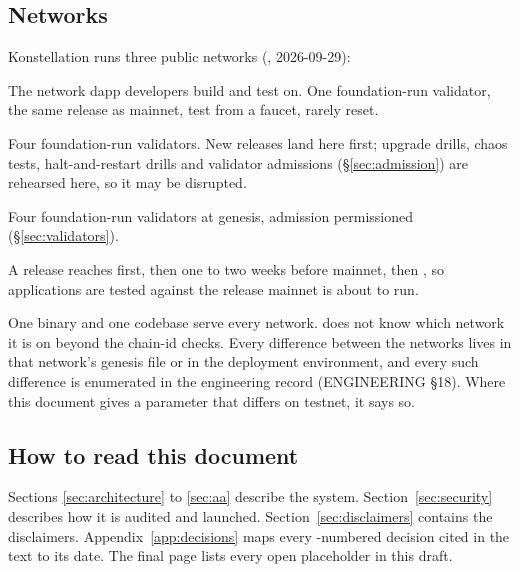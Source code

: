 \subsection{Networks}
\label{sec:networks}

Konstellation runs three public networks (, 2026-09-29):

\begin{description}[style=nextline]
\item[\code{devnet-1} --- for application developers.] The network dapp
  developers build and test on. One foundation-run validator, the same
  release as mainnet, test \kash{} from a faucet, rarely reset.
\item[\code{testnet-1} --- for validators and operations.] Four
  foundation-run validators. New releases land here first; upgrade drills,
  chaos tests, halt-and-restart drills and validator admissions
  (\S\ref{sec:admission}) are rehearsed here, so it may be disrupted.
\item[\code{konstellation-1} --- mainnet.] Four foundation-run validators at
  genesis, admission permissioned (\S\ref{sec:validators}).
\end{description}

A release reaches  first, then  one to two
weeks before mainnet, then , so applications are tested
against the release mainnet is about to run.

One binary and one codebase serve every network.  does not
know which network it is on beyond the chain-id checks. Every difference
between the networks lives in that network's genesis file or in
the deployment environment, and every such difference is enumerated in the
engineering record (ENGINEERING \S18). Where this document
gives a parameter that differs on testnet, it says so.

\subsection{How to read this document}

Sections \ref{sec:architecture} to \ref{sec:aa} describe the system.
Section~\ref{sec:security} describes how it is audited and launched.
Section~\ref{sec:disclaimers} contains the disclaimers. Appendix~\ref{app:decisions}
maps every -numbered decision cited in the text to its date. The final
page lists every open placeholder in this draft.
